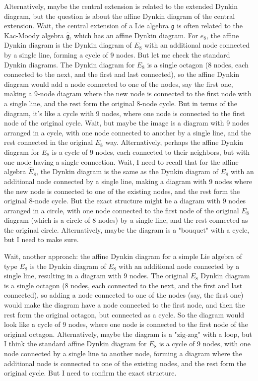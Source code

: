 Alternatively, maybe the central extension is related to the extended Dynkin diagram, but the question is about the affine Dynkin diagram of the central extension. Wait, the central extension of a Lie algebra \( \mathfrak{g} \) is often related to the Kac-Moody algebra \( \hat{\mathfrak{g}} \), which has an affine Dynkin diagram. For \( e_8 \), the affine Dynkin diagram is the Dynkin diagram of \( E_8 \) with an additional node connected by a single line, forming a cycle of 9 nodes. But let me check the standard Dynkin diagrams. The Dynkin diagram for \( E_8 \) is a single octagon (8 nodes, each connected to the next, and the first and last connected), so the affine Dynkin diagram would add a node connected to one of the nodes, say the first one, making a 9-node diagram where the new node is connected to the first node with a single line, and the rest form the original 8-node cycle. But in terms of the diagram, it's like a cycle with 9 nodes, where one node is connected to the first node of the original cycle. Wait, but maybe the image is a diagram with 9 nodes arranged in a cycle, with one node connected to another by a single line, and the rest connected in the original \( E_8 \) way. Alternatively, perhaps the affine Dynkin diagram for \( E_8 \) is a cycle of 9 nodes, each connected to their neighbors, but with one node having a single connection. Wait, I need to recall that for the affine algebra \( \hat{E}_8 \), the Dynkin diagram is the same as the Dynkin diagram of \( E_8 \) with an additional node connected by a single line, making a diagram with 9 nodes where the new node is connected to one of the existing nodes, and the rest form the original 8-node cycle. But the exact structure might be a diagram with 9 nodes arranged in a circle, with one node connected to the first node of the original \( E_8 \) diagram (which is a circle of 8 nodes) by a single line, and the rest connected as the original circle. Alternatively, maybe the diagram is a "bouquet" with a cycle, but I need to make sure.

Wait, another approach: the affine Dynkin diagram for a simple Lie algebra of type \( E_8 \) is the Dynkin diagram of \( E_8 \) with an additional node connected by a single line, resulting in a diagram with 9 nodes. The original \( E_8 \) Dynkin diagram is a single octagon (8 nodes, each connected to the next, and the first and last connected), so adding a node connected to one of the nodes (say, the first one) would make the diagram have a node connected to the first node, and then the rest form the original octagon, but connected as a cycle. So the diagram would look like a cycle of 9 nodes, where one node is connected to the first node of the original octagon. Alternatively, maybe the diagram is a "zig-zag" with a loop, but I think the standard affine Dynkin diagram for \( E_8 \) is a cycle of 9 nodes, with one node connected by a single line to another node, forming a diagram where the additional node is connected to one of the existing nodes, and the rest form the original cycle. But I need to confirm the exact structure.

